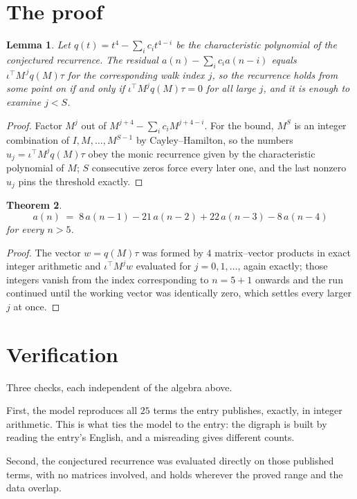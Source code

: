 \documentclass[11pt,a4paper]{article}
\theoremstyle{plain}
\newtheorem{theorem}{Theorem}
\newtheorem{lemma}[theorem]{Lemma}
\theoremstyle{definition}
\begin{document}
\section{The proof}

\begin{lemma}\label{lem:crit}
Let $q(t)=t^{4}-\sum_i c_it^{4-i}$ be the characteristic polynomial of the
conjectured recurrence. The residual $a(n)-\sum_ic_ia(n-i)$ equals
$\iota^{\!\top}M^{\,j}q(M)\tau$ for the corresponding walk index $j$, so the recurrence
holds from some point on if and only if $\iota^{\!\top}M^{j}q(M)\tau=0$ for all large $j$,
and it is enough to examine $j<S$.
\end{lemma}

\begin{proof}
Factor $M^{j}$ out of $M^{j+4}-\sum_ic_iM^{j+4-i}$. For the bound, $M^{S}$
is an integer combination of $I,M,\dots,M^{S-1}$ by Cayley--Hamilton, so the numbers
$u_j=\iota^{\!\top}M^{j}q(M)\tau$ obey the monic recurrence given by the characteristic
polynomial of $M$; $S$ consecutive zeros force every later one, and the last nonzero $u_j$
pins the threshold exactly.
\end{proof}

\begin{theorem}
\[
a(n)\;=\;8\,a(n-1) - 21\,a(n-2) + 22\,a(n-3) - 8\,a(n-4)
\]
for every $n>5$.
\end{theorem}

\begin{proof}
The vector $w=q(M)\tau$ was formed by $4$ matrix--vector products in exact integer
arithmetic and $\iota^{\!\top}M^{j}w$ evaluated for $j=0,1,\dots$, again exactly; those
integers vanish from the index corresponding to $n=5+1$ onwards and the run continued
until the working vector was identically zero, which settles every larger $j$ at once.
\end{proof}

\section{Verification}

Three checks, each independent of the algebra above.

First, the model reproduces all $25$ terms the entry publishes, exactly, in integer
arithmetic. This is what ties the model to the entry: the digraph is built by reading the
entry's English, and a misreading gives different counts.

Second, the conjectured recurrence was evaluated directly on those published terms, with no
matrices involved, and holds wherever the proved range and the data overlap.
\end{document}
